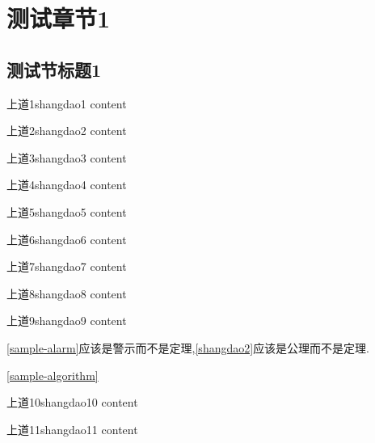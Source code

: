 \chapter{测试章节1}

\section{测试节标题1}

\begin{definition}{上道1}{shangdao1}
	content
\end{definition}

\begin{axiom}{上道2}{shangdao2}
	content
\end{axiom}

\begin{hypothesis}{上道3}{shangdao3}
	content
\end{hypothesis}

\begin{theorem}{上道4}{shangdao4}
	content
\end{theorem}

\begin{lemma}{上道5}{shangdao5}
	content
\end{lemma}

\begin{corollary}{上道6}{shangdao6}
	content
\end{corollary}

\begin{metatheorem}{上道7}{shangdao7}
	content
\end{metatheorem}

\begin{criteria}{上道8}{shangdao8}
	content
\end{criteria}

\begin{problem}{上道9}{shangdao9}
	content
\end{problem}

\autoref{sample-alarm}应该是警示而不是定理,\autoref{shangdao2}应该是公理而不是定理.


\autoref{sample-algorithm}

\begin{example}{上道10}{shangdao10}
	content
\end{example}

\begin{remark}{上道11}{shangdao11}
	content
\end{remark}

